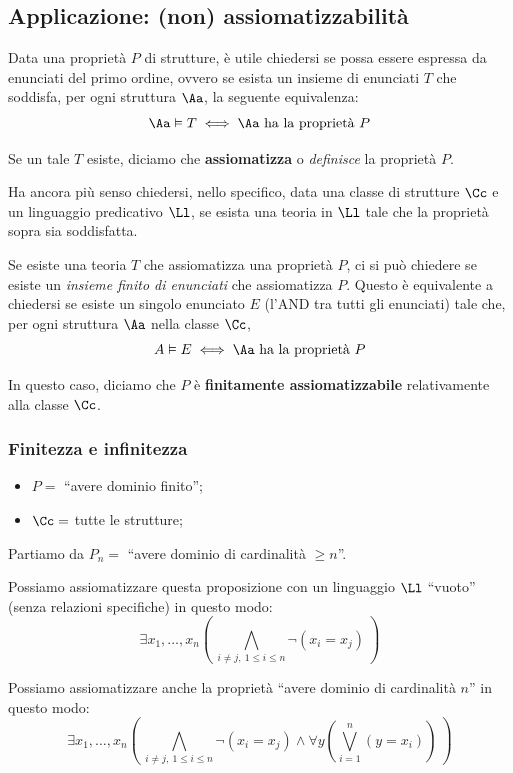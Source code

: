 \documentclass[a4paper,11pt]{report}
\begin{document}
\subsection{Applicazione: (non) assiomatizzabilità}

Data una proprietà \( P \) di strutture, è utile chiedersi se possa essere espressa da enunciati del primo ordine, ovvero se esista un insieme di enunciati \( T \) che soddisfa, per ogni struttura \( \Aa \), la seguente equivalenza:
\[ \Aa \vDash T \iff \Aa \text{ ha la proprietà }  P \]

Se un tale \( T \) esiste, diciamo che \textbf{assiomatizza} o \textit{definisce} la proprietà \( P \).

Ha ancora più senso chiedersi, nello specifico, data una classe di strutture \( \Cc \) e un linguaggio predicativo \( \Ll \), se esista una teoria in \(\Ll \) tale che la proprietà sopra sia soddisfatta.

Se esiste una teoria \( T \) che assiomatizza una proprietà \( P \), ci si può chiedere se esiste un \textit{insieme finito di enunciati} che assiomatizza \( P \). Questo è equivalente a chiedersi se esiste un singolo enunciato \( E \) {\color{gray} (l'AND tra tutti gli enunciati)} tale che, per ogni struttura \( \Aa \) nella classe \( \Cc \),
\[ A \vDash E \iff \Aa \text{ ha la proprietà } P\]


In questo caso, diciamo che \( P \) è \textbf{finitamente assiomatizzabile} relativamente alla classe \( \Cc \).

\subsubsection{Finitezza e infinitezza}

\begin{itemize}
    \item \( P = \) ``avere dominio finito'';
    \item \( \Cc =  \) tutte le strutture;
\end{itemize}


Partiamo da \( P_n = \) ``avere dominio di cardinalità \( \geq n \)''.

Possiamo assiomatizzare questa proposizione con un linguaggio \( \Ll \) ``vuoto'' (senza relazioni specifiche) in questo modo:
\[ 
    \exists x_1, \dots, x_n \left( \ \bigwedge_{i \neq j, \ 1\leq i\leq n} \neg (x_i = x_j)\ \right)
\]


{\color{CadetBlue}Possiamo assiomatizzare anche la proprietà ``avere dominio di cardinalità \( n \)'' in questo modo:
\[  
    \exists x_1, \dots, x_n \left( \ \bigwedge_{i \neq j, \ 1\leq i\leq n} \neg (x_i = x_j) \land \forall y \left( \bigvee_{i=1}^n (y = x_i)\right)\ \right)
\]
}
\end{document}
